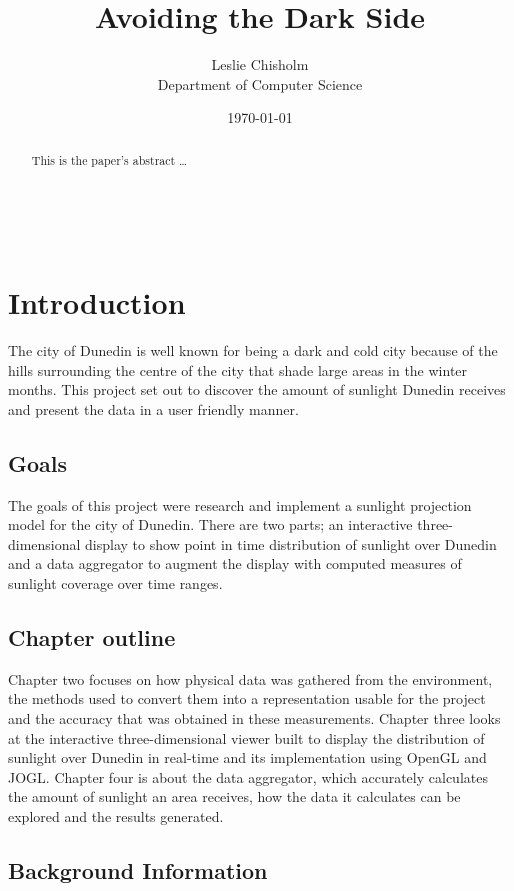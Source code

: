 \documentclass[12pt]{report}
\title{Avoiding the Dark Side}
\author{
        Leslie Chisholm \\
                Department of Computer Science\\
}
\date{\today}
\begin{document}
\maketitle

\begin{abstract}
This is the paper's abstract \ldots
\end{abstract}

\tableofcontents
\listoffigures\
\listofalgorithms
\chapter{Introduction}
The city of Dunedin is well known for being a dark and cold city because of the hills surrounding the centre of the city that shade large areas in the winter months. This project set out to discover the amount of sunlight Dunedin receives and present the data in a user friendly manner.\\

\section{Goals}
The goals of this project were research and implement a sunlight projection model for the city of Dunedin. There are two parts; an interactive three-dimensional display to show point in time distribution of sunlight over Dunedin and a data aggregator to augment the display with computed measures of sunlight coverage over time ranges.\\

\section{Chapter outline}
Chapter two focuses on how physical data was gathered from the environment, the methods used to convert them into a representation usable for the project and the accuracy that was obtained in these measurements. Chapter three looks at the interactive three-dimensional viewer built to display the distribution of sunlight over Dunedin in real-time and its implementation using OpenGL and JOGL. Chapter four is about the data aggregator, which accurately calculates the amount of sunlight an area receives, how the data it calculates can be explored and the results generated.\\

\section{Background Information}
\end{document}
